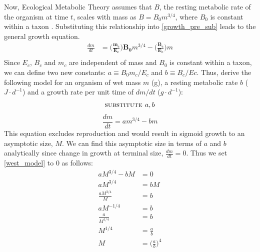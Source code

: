 \documentclass[a4paper]{article} %
\begin{document}
Now, Ecological Metabolic Theory assumes that $B$, the resting metabolic rate of the organism at time $t$, scales with mass as $B = B_{0}m^{3/4}$, where $B_0$ is constant within a taxon \autocite{West1997,brown2000-scaling-book, Brown2004}. Substituting this relationship into \cref{growth_pre_sub} leads to the general growth equation.
\begin{align*}
    \frac{dm}{dt} &= \bm{\Bigg(\frac{m_c}{E_c}\Bigg)B_{0}}m^{3/4} - \bm{\Bigg(\frac{B_{c}}{E_c}\Bigg)}m \\
\end{align*}
Since $E_c$, $B_c$ and $m_c$ are independent of mass and $B_0$ is constant within a taxon, we can define two new constants: $a \equiv B_{0}m_{c}/E_{c}$ and $b \equiv B_{c}/E{c}$. Thus, \textcite{West2001} derive the following model for an organism of wet mass $m$ (g), a resting metabolic rate $b$ ($J \cdot d^{-1}$) and a growth rate per unit time of $dm/dt$ ($g \cdot d^{-1}$):
\begin{align*}
    \textsc{substitute }a, b
\end{align*}
\begin{equation}
    \frac{dm}{dt} = am^{3/4} - bm \label{west_model}
\end{equation}
This equation excludes reproduction and would result in sigmoid growth to an asymptotic size, $M$. We can find this asymptotic size in terms of $a$ and $b$ analytically since change in growth at terminal size, $\frac{dm}{dt} = 0$. Thus we set \cref{west_model} to 0 as follows:
\begin{align*}
    aM^{3/4} - bM &= 0 \\
    aM^{3/4} &= bM \\
    \frac{aM^{3/4}}{M} &= b \\
    aM^{-1/4} &= b \\
    \frac{a}{M^{1/4}} &= b \\
    M^{1/4} &= \frac{a}{b} \\
    M &= \Big(\frac{a}{b}\Big)^4
\end{align*}
\end{document}
